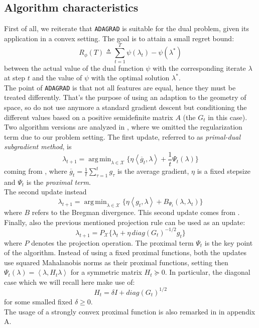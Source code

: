 \documentclass[notitlepage]{article}
\DeclareMathOperator*{\argmin}{arg\,min}
\begin{document}
\subsection{Algorithm characteristics}
First of all, we reiterate that \texttt{ADAGRAD} is suitable for the dual problem, given its application in a convex setting. The goal is to attain a small regret bound:
\begin{equation}
  R_\phi (T) \triangleq \sum_{t=1}^T \psi(\lambda_t) - \psi(\lambda^*)
\end{equation}
between the actual value of the dual function $\psi$ with the corresponding iterate $\lambda$ at step $t$ and the value of $\psi$ with the optimal solution $\lambda^*$.\\
The point of \texttt{ADAGRAD} is that not all features are equal, hence they must be treated differently. That's the purpose of using an adaption to the geometry of space, so do not use anymore a standard gradient descent but conditioning 
the different values based on a positive semidefinite matrix $A$ (the $G_t$ in this case).\\
Two algorithm versions are analyzed in \cite{JMLR:v12:duchi11a}, where we omitted the regularization term due to our problem setting. The first update, referred to as \textit{primal-dual subgradient method}, is 
\begin{equation}
  \lambda_{t+1} = \argmin_{\lambda \in \mathcal{X}} \{ \eta \left\langle \overline{g}_t,\lambda \right\rangle + \frac{1}{t} \Psi_t(\lambda) \}
  \label{eqn:primal-dual-update}
\end{equation}
coming from \cite{NIPS2009_7cce53cf}, where $\overline{g}_t = \frac{1}{t} \sum_{\tau=1}^t g_\tau$ is the average gradient, $\eta$ is a fixed stepsize and $\Psi_t$ is the \textit{proximal term}.\\
The second update instead
\begin{equation}
  \lambda_{t+1} = \argmin_{\lambda \in \mathcal{X}} \{ \eta \left\langle g_t,\lambda \right\rangle + B_{\Psi_t} (\lambda,\lambda_t) \}
  \label{eqn:composite-mirror-update}
\end{equation}
where $B$ refers to the Bregman divergence. This second update comes from \cite{inproceedings}.\\
Finally, also the previous mentioned projection rule can be used as an update:
\begin{equation}
  \lambda_{t+1} = P_{\mathcal{X}} \{ \lambda_t + \eta\, diag(G_t)^{-1/2} g_t \}
  \label{eqn:standard-rule}
\end{equation}
where $P$ denotes the projection operation. The proximal term $\Psi_t$ is the key point of the algorithm. Instead of using a fixed proximal functions, both the updates use squared Mahalanobis norms as their proximal functions, setting then $\Psi_t(\lambda) = \left\langle \lambda,H_t \lambda \right\rangle$ 
for a symmetric matrix $H_t \succeq 0$. In particular, the diagonal case which we will recall here make use of:
\[ H_t = \delta I + diag(G_t)^{1/2} \]
for some smalled fixed $\delta \ge 0$.\\
The usage of a strongly convex proximal function is also remarked in \cite{Frangioni2017} in appendix A.
\end{document}
